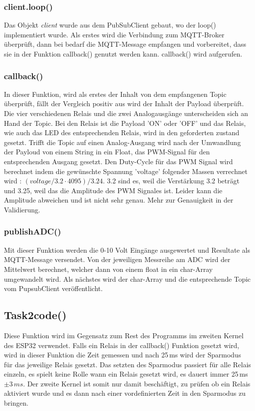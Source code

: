 \subsubsection{client.loop()}
 Das Objekt \textit{client} wurde aus dem PubSubClient gebaut, wo der loop() implementiert wurde. Als erstes wird die Verbindung zum MQTT-Broker überprüft, dann bei bedarf die MQTT-Message empfangen und vorbereitet, dass sie in der Funktion callback()  genutzt werden kann. callback() wird aufgerufen.
 \subsubsection{callback()}
 In dieser Funktion, wird als erstes der Inhalt von dem empfangenen Topic überprüft, fällt der Vergleich positiv aus wird der Inhalt der Payload überprüft. Die vier verschiedenen Relais und die zwei Analogausgänge unterscheiden sich an Hand der Topic. Bei den Relais ist die Payload 'ON' oder 'OFF' und das Relais, wie auch das LED des entsprechenden Relais, wird in den geforderten zustand gesetzt. Trifft die Topic auf einen Analog-Ausgang wird nach der Umwandlung der Payloud von einem String in ein Float, das PWM-Signal für den entsprechenden Ausgang gesetzt. Den Duty-Cycle für das PWM Signal wird berechnet indem die gewünschte Spannung 'voltage' folgender Massen verrechnet wird : $(voltage/3.2 \cdot 4095)/3.24$. 3.2 sind es, weil die Verstärkung 3.2 beträgt und 3.25, weil das die Amplitude des PWM Signales ist. Leider kann die Amplitude abweichen und ist nicht sehr genau. Mehr zur Genauigkeit in der Validierung.
 
 \subsubsection{publishADC()}
Mit dieser Funktion werden die 0-10 Volt Eingänge ausgewertet und Resultate als MQTT-Message versendet. Von der jeweiligen Messreihe am ADC wird der Mittelwert berechnet, welcher dann von einem float in ein char-Array umgewandelt wird. Als nächstes wird der char-Array und die entsprechende Topic vom PupsubClient veröffentlicht.

\subsection{Task2code()}
Diese Funktion wird im Gegensatz zum Rest des Programms im zweiten Kernel des ESP32 verwendet. Falls ein Relais in der callback() Funktion gesetzt wird, wird in dieser Funktion die Zeit gemessen und nach 25\,ms wird der Sparmodus für das jeweilige Relais gesetzt. Das setzten des Sparmodus passiert für alle Relais einzeln, es spielt keine Rolle wann ein Relais gesetzt wird, es dauert immer 25\,ms $\pm 3 \,ms$. Der zweite Kernel ist somit nur damit beschäftigt, zu prüfen ob ein Relais aktiviert wurde und es dann nach einer vordefinierten Zeit in den Sparmodus zu bringen.
\newpage

